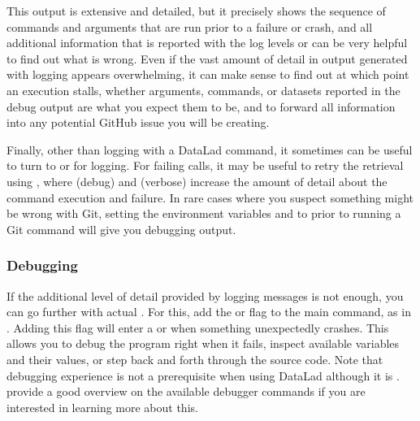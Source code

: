 \sphinxAtStartPar
This output is extensive and detailed, but it precisely shows the sequence of commands and arguments that are run prior to a failure or crash, and all additional information that is reported with the log levels  or  can be very helpful to find out what is wrong.
Even if the vast amount of detail in output generated with  logging appears overwhelming, it can make sense to find out at which point an execution stalls, whether arguments, commands, or datasets reported in the debug output are what you expect them to be, and to forward all information into any potential GitHub issue you will be creating.

\sphinxAtStartPar
Finally, other than logging with a DataLad command, it sometimes can be useful to turn to {\hyperref[\detokenize{glossary:term-git-annex}]{}} or {\hyperref[\detokenize{glossary:term-Git}]{}} for logging.
For failing  calls, it may be useful to retry the retrieval using , where  (debug) and  (verbose) increase the amount of detail about the command execution and failure.
In rare cases where you suspect something might be wrong with Git, setting the environment variables  and  to  prior to running a Git command will give you debugging output.


\subsubsection{Debugging}
\label{\detokenize{basics/101-135-help:debug}}\label{\detokenize{basics/101-135-help:id3}}
\sphinxAtStartPar
If the additional level of detail provided by logging messages is not enough, you can go further with actual {\hyperref[\detokenize{glossary:term-debugging}]{}}.
For this, add the  or  flag to the main  command, as in .
Adding this flag will enter a  or  when something unexpectedly crashes.
This allows you to debug the program right when it fails, inspect available variables and their values, or step back and forth through the source code.
Note that debugging experience is not a prerequisite when using DataLad \textendash{} although it is .
 provide a good overview on the available debugger commands if you are interested in learning more about this.


